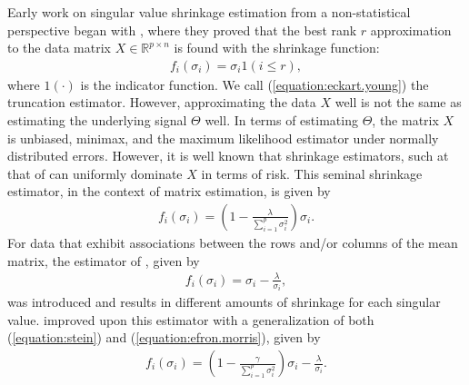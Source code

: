 Early work on singular value shrinkage estimation from a
non-statistical perspective began with \cite{eckart1936approximation},
where they proved that the best rank $r$ approximation to the data
matrix $X \in \mathbb{R}^{p \times n}$ is found with the shrinkage
function:
\begin{align}
  \label{equation:eckart.young}
  f_i(\sigma_i) = \sigma_i 1(i \leq r),
\end{align}
where $1(\cdot)$ is the indicator function. We call
(\ref{equation:eckart.young}) the truncation estimator. However,
approximating the data $X$ well is not the same as estimating the
underlying signal $\Theta$ well. In terms of estimating $\Theta$, the
matrix $X$ is unbiased, minimax, and the maximum likelihood estimator
under normally distributed errors. However, it is well known that
shrinkage estimators, such at that of \cite{stein1981estimation} can
uniformly dominate $X$ in terms of risk. This seminal shrinkage
estimator, in the context of matrix estimation, is given by
\begin{align}
  \label{equation:stein}
  f_i(\sigma_i) = \left(1 - \frac{\lambda}{\sum_{i = 1}^p\sigma_i^2}\right)\sigma_i.
\end{align}
For data that exhibit associations between the rows and/or columns of
the mean matrix, the estimator of \cite{efron1972empirical}, given by
\begin{align}
  \label{equation:efron.morris}
  f_i(\sigma_i) = \sigma_i - \frac{\lambda}{\sigma_i},
\end{align}
was introduced and results in different amounts of shrinkage for each
singular value.  \cite{efron1976multivariate} improved upon this
estimator with a generalization of both (\ref{equation:stein}) and
(\ref{equation:efron.morris}), given by
\begin{align}
  \label{equation:improved.em}
  f_i(\sigma_i) = \left(1 - \frac{\gamma}{\sum_{i = 1}^p\sigma_i^2}\right)\sigma_i - \frac{\lambda}{\sigma_i}.
\end{align}

